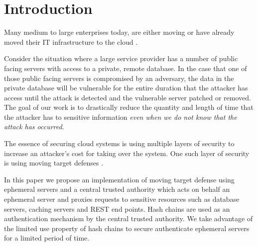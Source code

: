 \documentclass{sig-alternate-05-2015}
\begin{document}
\printccsdesc


\section{Introduction}

Many medium to large enterprises today, are either moving or have already moved their IT infrastructure to the cloud \cite{mcafee_what_2011}.

Consider the situation where a large service provider has a number of public facing servers with access to a private, remote database.  In the case that one of those public facing servers is compromised by an adversary, the data in the private database will be vulnerable for the entire duration that the attacker has access until the attack is detected and the vulnerable server patched or removed.  The goal of our work is to drastically reduce the quantity and length of time that the attacker has to sensitive information \textit{even when we do not know that the attack has occurred}. 

The essence of securing cloud systems is using multiple layers \cite{panwar_layered_2011} of security to increase an attacker's cost for taking over the system. One such layer of security is using moving target defenses \cite{evans_effectiveness_2011}. 


In this paper we propose an implementation of moving target defense using ephemeral servers and a central trusted authority which acts on behalf an ephemeral server and proxies requests to sensitive resources such as database servers, caching servers and REST end points. Hash chains are used as an authentication mechanism by the central trusted authority. We take advantage of the limited use property of hash chains to secure authenticate ephemeral servers for a limited period of time.
\end{document}
